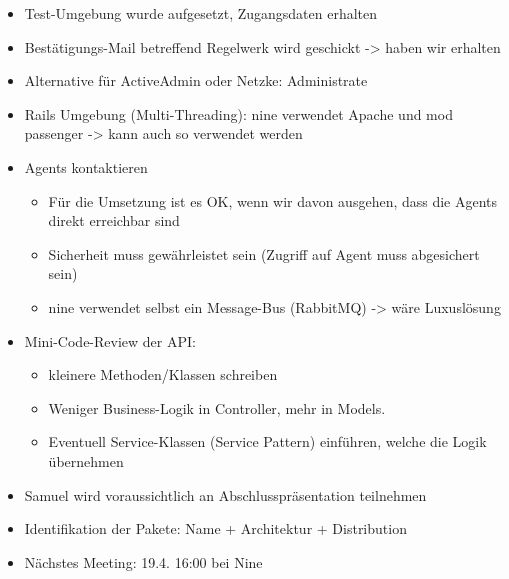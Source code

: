 \documentclass[class=scrbook,crop=false]{standalone}
\begin{document}
    \begin{itemize}
        \item Test-Umgebung wurde aufgesetzt, Zugangsdaten erhalten
        \item Bestätigungs-Mail betreffend Regelwerk wird geschickt -> haben wir erhalten
        \item Alternative für ActiveAdmin oder Netzke: Administrate
        \item Rails Umgebung (Multi-Threading): nine verwendet Apache und mod \textunderscore passenger -> kann auch so verwendet werden
        \item Agents kontaktieren
        \begin{itemize}
            \item Für die Umsetzung ist es OK, wenn wir davon ausgehen, dass die Agents direkt erreichbar sind
            \item Sicherheit muss gewährleistet sein (Zugriff auf Agent muss abgesichert sein)
            \item nine verwendet selbst ein Message-Bus (RabbitMQ) -> wäre Luxuslösung
        \end{itemize}
        \item Mini-Code-Review der API:
        \begin{itemize}
            \item kleinere Methoden/Klassen schreiben
            \item Weniger Business-Logik in Controller, mehr in Models.
            \item Eventuell Service-Klassen (Service Pattern) einführen, welche die Logik übernehmen
        \end{itemize}
        \item Samuel wird voraussichtlich an Abschlusspräsentation teilnehmen
        \item Identifikation der Pakete: Name + Architektur + Distribution
        \item Nächstes Meeting: 19.4. 16:00 bei Nine
    \end{itemize}
\end{document}
